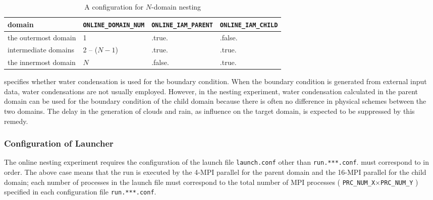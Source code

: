 \begin{table}[htb]
\begin{center}
\caption{A configuration for $N$-domain nesting}
\begin{tabularx}{150mm}{|l|l|l|X|} \hline
 \rowcolor[gray]{0.9} domain & \verb|ONLINE_DOMAIN_NUM| & \verb|ONLINE_IAM_PARENT| & \verb|ONLINE_IAM_CHILD|\\ \hline
 the outermost domain & 1            & .true.  & .false. \\ \hline
 intermediate domains & 2 -- ($N-1$) & .true.  & .true. \\ \hline
 the innermost domain & $N$          & .false. & .true. \\ \hline
\end{tabularx}
\label{tab:triple_nested}
\end{center}
\end{table}


 specifies whether water condensation is used for the boundary condition. When the boundary condition is generated from external input data, water condensations are not usually employed. However, in the nesting experiment, water condensation calculated in the parent domain can be used for the boundary condition of the child domain because there is often no difference in physical schemes between the two domains.
The delay in the generation of clouds and rain, as influence on the target domain, is expected to be suppressed by this remedy.

\subsubsection{Configuration of Launcher}
\label{subsubsec:launch}
The online nesting experiment requires the configuration of the launch file \verb|launch.conf|
other than \verb|run.***.conf|.
 must correspond to  in order.
The above case means that
the run is executed by
the 4-MPI parallel for the parent domain 
and the 16-MPI parallel for the child domain;
each number of processes in the launch file 
must correspond to the total number of MPI processes ( \verb|PRC_NUM_X|$\times$\verb|PRC_NUM_Y| )
specified in each configuration file \verb|run.***.conf|.

